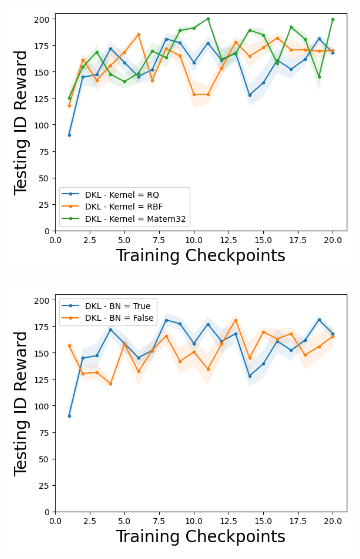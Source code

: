 \begin{figure}
\begin{subfigure}{.24\textwidth}
        \includegraphics[width=\textwidth]{sections/011_icml2022/resources/CartPole-v0-mean_reward_-testing-hyperparameter-kernel-dkl.png}  
    \end{subfigure}
        \begin{subfigure}{.24\textwidth}
        \includegraphics[width=\textwidth]{sections/011_icml2022/resources/CartPole-v0-mean_reward_-testing-hyperparameter-bn-dkl.png}  
    \end{subfigure}
    

\end{figure}
